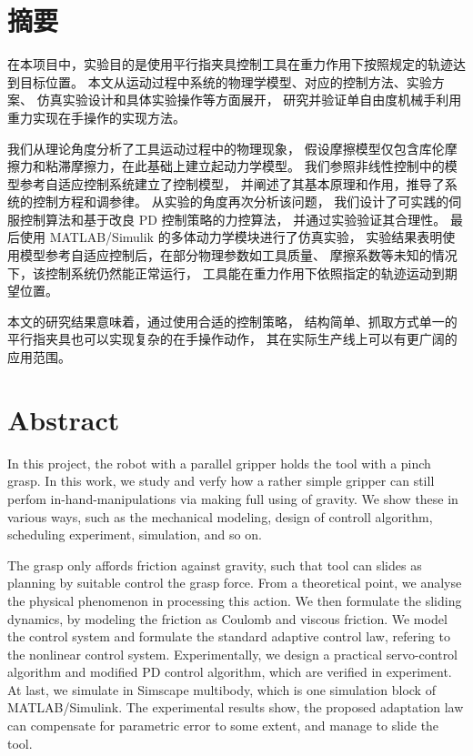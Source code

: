 

\chapter{摘要}
在本项目中，实验目的是使用平行指夹具控制工具在重力作用下按照规定的轨迹达到目标位置。
本文从运动过程中系统的物理学模型、对应的控制方法、实验方案、
仿真实验设计和具体实验操作等方面展开，
研究并验证单自由度机械手利用重力实现在手操作的实现方法。

我们从理论角度分析了工具运动过程中的物理现象，
假设摩擦模型仅包含库伦摩擦力和粘滞摩擦力，在此基础上建立起动力学模型。
我们参照非线性控制中的模型参考自适应控制系统建立了控制模型，
并阐述了其基本原理和作用，推导了系统的控制方程和调参律。
从实验的角度再次分析该问题，
我们设计了可实践的伺服控制算法和基于改良 PD 控制策略的力控算法，
并通过实验验证其合理性。
最后使用 MATLAB/Simulik 的多体动力学模块进行了仿真实验，
实验结果表明使用模型参考自适应控制后，在部分物理参数如工具质量、
摩擦系数等未知的情况下，该控制系统仍然能正常运行，
工具能在重力作用下依照指定的轨迹运动到期望位置。

本文的研究结果意味着，通过使用合适的控制策略，
结构简单、抓取方式单一的平行指夹具也可以实现复杂的在手操作动作，
其在实际生产线上可以有更广阔的应用范围。



\chapter{Abstract}
In this project, the robot with a parallel gripper holds the tool with a pinch grasp.
In this work, we study and verfy how a rather simple gripper can still perfom in-hand-manipulations via making full using of gravity.
We show these in various ways, such as the mechanical modeling,
design of controll algorithm, scheduling experiment, simulation, and so on.

The grasp only affords friction against gravity,
such that tool can slides as planning by suitable control the grasp force.
From a theoretical point, we analyse the physical phenomenon in processing this action.
We then formulate the sliding dynamics,
by modeling the friction as Coulomb and viscous friction.
We model the control system and formulate the standard adaptive control law,
refering to the nonlinear control system.
Experimentally, we design a practical servo-control algorithm and
modified PD control algorithm, which are verified in experiment.
At last, we simulate in Simscape multibody,
which is one simulation block of MATLAB/Simulink.
The experimental results show, the proposed adaptation law can
compensate for parametric error to some extent, and manage to slide the tool.

